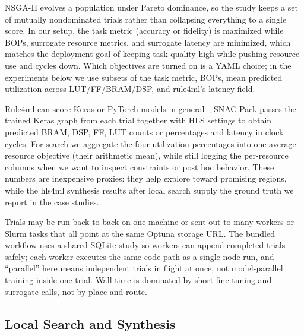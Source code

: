 \documentclass[11pt]{article}
\begin{document}
NSGA-II evolves a population under Pareto dominance, so the study keeps a set of mutually nondominated trials rather than collapsing everything to a single score.
In our setup, the task metric (accuracy or fidelity) is maximized while BOPs, surrogate resource metrics, and surrogate latency are minimized, which matches the deployment goal of keeping task quality high while pushing resource use and cycles down.
Which objectives are turned on is a YAML choice; in the experiments below we use subsets of the task metric, BOPs, mean predicted utilization across LUT/FF/BRAM/DSP, and rule4ml's latency field.

Rule4ml can score Keras or PyTorch models in general~\citep{rahimifar2025rule4ml}; SNAC-Pack passes the trained Keras graph from each trial together with HLS settings to obtain predicted BRAM, DSP, FF, LUT counts or percentages and latency in clock cycles.
For search we aggregate the four utilization percentages into one average-resource objective (their arithmetic mean), while still logging the per-resource columns when we want to inspect constraints or post hoc behavior.
These numbers are inexpensive proxies: they help explore toward promising regions, while the hls4ml synthesis results after local search supply the ground truth we report in the case studies.

Trials may be run back-to-back on one machine or sent out to many workers or Slurm tasks that all point at the same Optuna storage URL.
The bundled workflow uses a shared SQLite study so workers can append completed trials safely; each worker executes the same code path as a single-node run, and ``parallel'' here means independent trials in flight at once, not model-parallel training inside one trial.
Wall time is dominated by short fine-tuning and surrogate calls, not by place-and-route.

\subsection{Local Search and Synthesis}
\label{sec:method-local}

\end{document}
